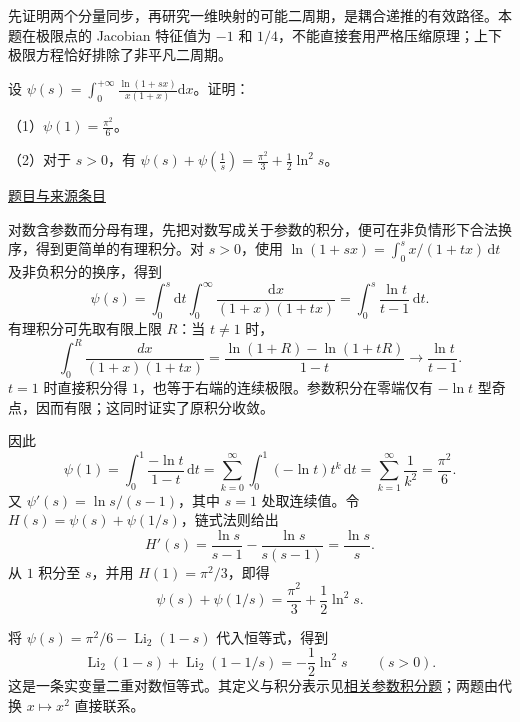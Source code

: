 \documentclass[UTF8,12pt,a4paper,fontset=fandol]{ctexart}
\begin{document}
\begin{remark}[方法与条件]先证明两个分量同步，再研究一维映射的可能二周期，是耦合递推的有效路径。本题在极限点的 Jacobian 特征值为 $-1$ 和 $1/4$，不能直接套用严格压缩原理；上下极限方程恰好排除了非平凡二周期。\end{remark}

\begin{example}[来源序号6]\label{ex:ch05-14th-A-makeup:6}\label{pr:ch05-14th-A-makeup:6}

设 $\psi(s) = \int_0^{+\infty} \frac{\ln(1+sx)}{x(1+x)} \mathrm{d}x$。证明：

（1）$\psi(1) = \frac{\pi^2}{6}$。

（2）对于 $s > 0$，有 $\psi(s) + \psi\left(\frac{1}{s}\right) = \frac{\pi^2}{3} + \frac{1}{2} \ln^2 s$。

\par\href{https://github.com/lzxcr/cmc-mathematics/blob/64916fa1fdbc3e444a652eca204d5669058ee321/src/problems/preliminary/14-makeup/06.md}{题目与来源条目}

\end{example}

\begin{solve}\label{ans:ch05-14th-A-makeup:6}

对数含参数而分母有理，先把对数写成关于参数的积分，便可在非负情形下合法换序，得到更简单的有理积分。对 $s>0$，使用 $\ln(1+sx)=\int_0^s x/(1+tx)\,\mathrm dt$ 及非负积分的换序，得到
\[
\psi(s)=\int_0^s\!\mathrm dt\int_0^\infty
\frac{\mathrm dx}{(1+x)(1+tx)}
=\int_0^s\frac{\ln t}{t-1}\,\mathrm dt.
\]
有理积分可先取有限上限 $R$：当 $t\ne1$ 时，
\[
\int_0^R\frac{dx}{(1+x)(1+tx)}
=\frac{\ln(1+R)-\ln(1+tR)}{1-t}
\longrightarrow\frac{\ln t}{t-1}.
\]
$t=1$ 时直接积分得 $1$，也等于右端的连续极限。参数积分在零端仅有 $-\ln t$ 型奇点，因而有限；这同时证实了原积分收敛。

因此
\[
\psi(1)=\int_0^1\frac{-\ln t}{1-t}\,\mathrm dt
=\sum_{k=0}^\infty\int_0^1(-\ln t)t^k\,\mathrm dt
=\sum_{k=1}^\infty\frac1{k^2}=\frac{\pi^2}{6}.
\]
又 $\psi'(s)=\ln s/(s-1)$，其中 $s=1$ 处取连续值。令 $H(s)=\psi(s)+\psi(1/s)$，链式法则给出
\[
H'(s)=\frac{\ln s}{s-1}-\frac{\ln s}{s(s-1)}
=\frac{\ln s}{s}.
\]
从 $1$ 积分至 $s$，并用 $H(1)=\pi^2/3$，即得
\[
\psi(s)+\psi(1/s)=\frac{\pi^2}{3}+\frac12\ln^2s.
\]

\end{solve}

\begin{remark}[方法与条件]将 $\psi(s)=\pi^2/6-\operatorname{Li}_2(1-s)$ 代入恒等式，得到
\[
\operatorname{Li}_2(1-s)+\operatorname{Li}_2(1-1/s)
=-\frac12\ln^2s\qquad(s>0).
\]
这是一条实变量二重对数恒等式。其定义与积分表示见\hyperref[pr:ch02-16th-A:2]{相关参数积分题}；两题由代换 $x\mapsto x^2$ 直接联系。\end{remark}
\end{document}
